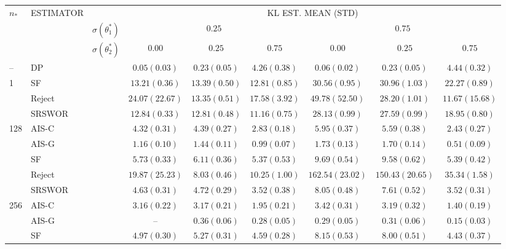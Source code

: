 
\begin{tabular}{lllccc|ccc}
\toprule
\multirow{3}{*}{$n_*$} & \multirow{3}{*}{ESTIMATOR} && \multicolumn{6}{c}{KL EST. MEAN (STD)} \\
\cmidrule{4-9}
&&$\sigma(\theta^*_1)$& \multicolumn{3}{c|}{$0.25$} & \multicolumn{3}{c}{$0.75$} \\
&&$\sigma(\theta^*_2)$& $0.00$ & $0.25$ & $0.75$ & $0.00$ & $0.25$ & $0.75$ 
\\
\midrule
\multirow{1}{*}{--}  & DP     &  & $0.05(0.03)$   & $0.23(0.05)$   & $4.26(0.38)$   & $0.06(0.02)$   & $0.23(0.05)$   & $4.44(0.32)$   \\
\midrule
\multirow{3}{*}{1}   & SF     &  & $13.21(0.36)$  & $13.39(0.50)$  & $12.81(0.85)$  & $30.56(0.95)$  & $30.96(1.03)$  & $22.27(0.89)$  \\
                     & Reject &  & $24.07(22.67)$ & $13.35(0.51)$  & $17.58(3.92)$  & $49.78(52.50)$ & $28.20(1.01)$  & $11.67(15.68)$ \\
                     & SRSWOR &  & $12.84(0.33)$  & $12.81(0.48)$  & $11.16(0.75)$  & $28.13(0.99)$  & $27.59(0.99)$  & $18.95(0.80)$  \\
\midrule
\multirow{5}{*}{128} & AIS-C  &  & $4.32(0.31)$   & $4.39(0.27)$   & $2.83(0.18)$   & $5.95(0.37)$   & $5.59(0.38)$   & $2.43(0.27)$   \\
                     & AIS-G  &  & $1.16(0.10)$   & $1.44(0.11)$   & $0.99(0.07)$   & $1.73(0.13)$   & $1.70(0.14)$   & $0.51(0.09)$   \\
                     & SF     &  & $5.73(0.33)$   & $6.11(0.36)$   & $5.37(0.53)$   & $9.69(0.54)$   & $9.58(0.62)$   & $5.39(0.42)$   \\
                     & Reject &  & $19.87(25.23)$ & $8.03(0.46)$   & $10.25(1.00)$  & $162.54(23.02)$& $150.43(20.65)$& $35.34(1.58)$  \\
                     & SRSWOR &  & $4.63(0.31)$   & $4.72(0.29)$   & $3.52(0.38)$   & $8.05(0.48)$   & $7.61(0.52)$   & $3.52(0.31)$   \\
\midrule
\multirow{5}{*}{256} & AIS-C  &  & $3.16(0.22)$   & $3.17(0.21)$   & $1.95(0.21)$   & $3.42(0.31)$   & $3.19(0.32)$   & $1.40(0.19)$   \\
                     & AIS-G  &  & --             & $0.36(0.06)$   & $0.28(0.05)$   & $0.29(0.05)$   & $0.31(0.06)$   & $0.15(0.03)$   \\
                     & SF     &  & $4.97(0.30)$   & $5.27(0.31)$   & $4.59(0.28)$   & $8.15(0.53)$   & $8.00(0.51)$   & $4.43(0.37)$   \\

\end{tabular}
